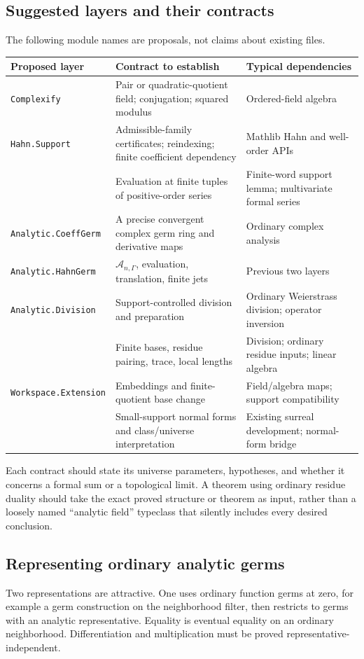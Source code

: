 \documentclass[11pt,letterpaper]{article}
\theoremstyle{definition}
\theoremstyle{remark}
\newcommand{\A}{\mathscr A}
\numberwithin{equation}{section}
\begin{document}
\subsection{Suggested layers and their contracts}
The following module names are proposals, not claims about existing files.
\begin{longtable}{@{}L{0.25\textwidth}L{0.39\textwidth}L{0.28\textwidth}@{}}
\toprule
Proposed layer & Contract to establish & Typical dependencies\\
\midrule\endhead
\texttt{Complexify} & Pair or quadratic-quotient field; conjugation; squared modulus & Ordered-field algebra\\[0.35em]
\texttt{Hahn.Support} & Admissible-family certificates; reindexing; finite coefficient dependency & Mathlib Hahn and well-order APIs\\[0.35em]
 & Evaluation at finite tuples of positive-order series & Finite-word support lemma; multivariate formal series\\[0.35em]
\texttt{Analytic.CoeffGerm} & A precise convergent complex germ ring and derivative maps & Ordinary complex analysis\\[0.35em]
\texttt{Analytic.HahnGerm} & \(\A_{n,\Gamma}\), evaluation, translation, finite jets & Previous two layers\\[0.35em]
\texttt{Analytic.Division} & Support-controlled division and preparation & Ordinary Weierstrass division; operator inversion\\[0.35em]
 & Finite bases, residue pairing, trace, local lengths & Division; ordinary residue inputs; linear algebra\\[0.35em]
\texttt{Workspace.Extension} & Embeddings and finite-quotient base change & Field/algebra maps; support compatibility\\[0.35em]
 & Small-support normal forms and class/universe interpretation & Existing surreal development; normal-form bridge\\
\bottomrule
\end{longtable}

Each contract should state its universe parameters, hypotheses, and whether it concerns a formal sum or a topological limit. A theorem using ordinary residue duality should take the exact proved structure or theorem as input, rather than a loosely named ``analytic field'' typeclass that silently includes every desired conclusion.

\subsection{Representing ordinary analytic germs}
Two representations are attractive. One uses ordinary function germs at zero, for example a germ construction on the neighborhood filter, then restricts to germs with an analytic representative. Equality is eventual equality on an ordinary neighborhood. Differentiation and multiplication must be proved representative-independent.
\end{document}
